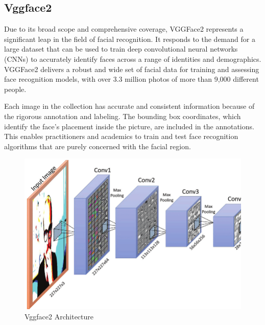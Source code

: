 \subsection{Vggface2}
Due to its broad scope and comprehensive coverage, VGGFace2 represents a significant leap in the field of facial recognition. It responds to the demand for a large dataset that can be used to train deep convolutional neural networks (CNNs) to accurately identify faces across a range of identities and demographics. VGGFace2 delivers a robust and wide set of facial data for training and assessing face recognition models, with over 3.3 million photos of more than 9,000 different people.

Each image in the collection has accurate and consistent information because of the rigorous annotation and labeling. The bounding box coordinates, which identify the face's placement inside the picture, are included in the annotations. This enables practitioners and academics to train and test face recognition algorithms that are purely concerned with the facial region.


\begin{figure}[h]
    \centering
    \includegraphics[width= 5in ]{img/The-VGG-Face-architecture-visualizing-low-to-high-level-features-captured-as-a-facial.png}
    \caption{Vggface2 Architecture}
\end{figure}